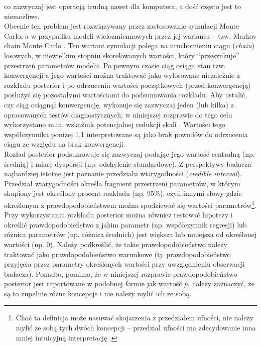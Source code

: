 \documentclass[man]{apa6}
\begin{document}
co zazwyczaj jest operacją trudną nawet dla komputera, a dość często jest to niemożliwe. \\
Obecnie ten problem jest rozwiązywany przez zastosowanie symulacji Monte Carlo, a w przypadku modeli wielozmiennowych przez jej wariantu -- tzw. Markov chain Monte Carlo \parencite[MCMC,][]{hastings1970monte}. Ten wariant symulacji polega na uruchomieniu ciągu (\emph{chain}) losowych, w niewielkim stopniu skorelowanych wartości, który ``przeszukuje'' przestrzeń parametrów modelu. Po pewnym czasie ciąg osiąga stan tzw. konwergencji a jego wartości można traktować jako wylosowane niezależnie z rozkładu posterior i po odrzuceniu wartości początkowych (przed konwergencją) posłużyć się pozostałymi wartościami do podsumowania rozkładu. Aby ustalić, czy ciąg osiągnął konwergencję, wykonuje się zazwyczaj jeden (lub kilka) z opracowanych testów diagnostycznych; w niniejszej rozprawie do tego celu wykorzystano m.in. wskaźnik potencjalnej redukcji skali \parencite[\emph{potential scale reduction factor},][]{gelman1992inference}. Wartości tego współczynnika poniżej 1,1 interpretowane są jako brak powodów do odrzucenia ciągu ze względu na brak konwergencji.\\
Rozład posterior podsumowuje się zazwyczaj podając jego wartość centralną (np. średnią) i miarę dyspersji (np. odchylenie standardowe). Z perspektywy badacza najbardziej istotne jest poznanie przedziału wiarygodności (\emph{credible interval}). Przedział wiarygodności określa fragment przestrzeni parametrów, w którym skupiony jest określony procent rozkładu (np. 95\%); czyli innymi słowy gdzie określonym z prawdopodobieństwem można spodziewać się wartości parametrów\footnote{Choć ta definicja może nasuwać skojarzenia z przedziałem ufności, nie należy mylić ze sobą tych dwóch koncepcji -- przedział ufności ma zdecydowanie inna mniej intuicyjną interpretację \parencite[zob. np.,][]{gill2014bayesian}.}. Przy wykorzystaniu rozkładu posterior można również testować hipotezy i określić prawdopodobieństwo z jakim parametr (np. współczynnik regresji) lub różnica parametrów (np. różnica średnich) jest większa lub mniejsza od określonej wartości (np. 0). Należy podkreślić, że takie prawdopodobieństwo należy traktować jako prawdopodobieństwo warunkowe (tj. prawdopodobieństwo przyjęcia przez parametry określonych wartości przy uwzględnieniu obserwacji badacza). Ponadto, pomimo, że w niniejszej rozprawie prawdopodobieństwo posterior jest raportowane w podobnej formie jak wartość $p$, należy zaznaczyć, że są to zupełnie różne koncepcje i nie należy mylić ich ze sobą.
\end{document}
